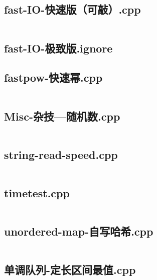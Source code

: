 \documentclass[a4paper,landscape,twocolumn]{article} %
\begin{document}
\subsection{fast-IO-快速版（可敲）.cpp}
\inputminted{c++}{./codes/039}
\subsection{fast-IO-极致版.ignore}
\subsection{fastpow-快速幂.cpp}
\inputminted{c++}{./codes/041}
\subsection{Misc-杂技---随机数.cpp}
\inputminted{c++}{./codes/042}
\subsection{string-read-speed.cpp}
\inputminted{c++}{./codes/043}
\subsection{timetest.cpp}
\inputminted{c++}{./codes/044}
\subsection{unordered-map-自写哈希.cpp}
\inputminted{c++}{./codes/045}
\subsection{单调队列-定长区间最值.cpp}
\inputminted{c++}{./codes/046}
\end{document}
